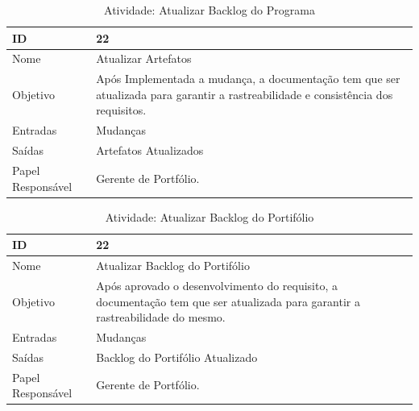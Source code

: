 \begin{table}[H]
  \centering
    \begin{tabular}{| m{5em} | m{10cm} |}
      \hline
      ID       & 22   \\ \hline
      Nome     & Atualizar Artefatos  \\ \hline
      Objetivo & Após Implementada a mudança, a documentação tem que ser atualizada para garantir a rastreabilidade e consistência dos requisitos.  \\ \hline
      Entradas & Mudanças\\ \hline
      Saídas   & Artefatos Atualizados  \\ \hline
      Papel Responsável   & Gerente de Portfólio. \\ \hline
    \end{tabular}
    \caption{Atividade: Atualizar Backlog do Programa}
    \label{tabela:atividade22}
\end{table}

\begin{table}[H]
  \centering
    \begin{tabular}{| m{5em} | m{10cm} |}
      \hline
      ID       & 22   \\ \hline
      Nome     & Atualizar Backlog do Portifólio  \\ \hline
      Objetivo & Após aprovado o desenvolvimento do requisito, a documentação tem que ser atualizada para garantir a rastreabilidade do mesmo.  \\ \hline
      Entradas & Mudanças \\ \hline
      Saídas   & Backlog do Portifólio Atualizado \\ \hline
      Papel Responsável   & Gerente de Portfólio. \\ \hline
    \end{tabular}
    \caption{Atividade: Atualizar Backlog do Portifólio}
    \label{tabela:atividade22}
\end{table}
